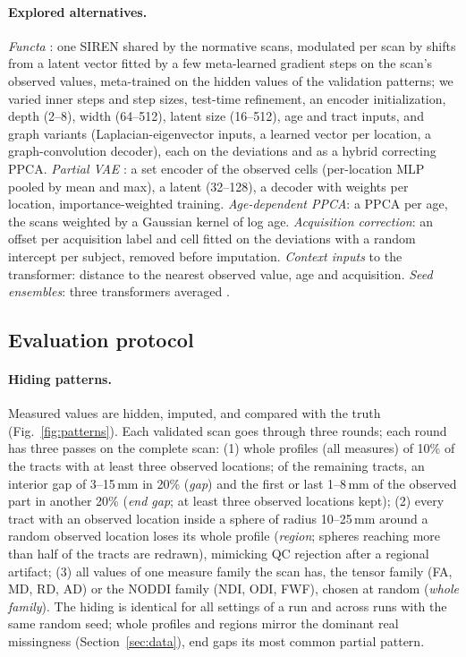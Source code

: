 \documentclass[11pt]{article}
\begin{document}
\paragraph{Explored alternatives.} \emph{Functa} \citep{dupont2022functa,friedrich2025medfuncta}: one SIREN shared
by the normative scans, modulated per scan by shifts from a latent vector fitted by a few meta-learned gradient steps
on the scan's observed values, meta-trained on the hidden values of the validation patterns; we varied inner steps and
step sizes, test-time refinement, an encoder initialization, depth (2--8), width (64--512), latent size (16--512), age
and tract inputs, and graph variants (Laplacian-eigenvector inputs, a learned vector per location, a graph-convolution
decoder), each on the deviations and as a hybrid correcting PPCA. \emph{Partial VAE}
\citep{ma2019eddi,mattei2019miwae}: a set encoder of the observed cells (per-location MLP pooled by mean and max), a
latent (32--128), a decoder with weights per location, importance-weighted training. \emph{Age-dependent PPCA}: a PPCA
per age, the scans weighted by a Gaussian kernel of log age. \emph{Acquisition correction}: an offset per acquisition
label and cell fitted on the deviations with a random intercept per subject, removed before imputation. \emph{Context
inputs} to the transformer: distance to the nearest observed value, age and acquisition. \emph{Seed ensembles}: three
transformers averaged \citep{lakshminarayanan2017ensembles}.

\subsection{Evaluation protocol}\label{sec:protocol}

\paragraph{Hiding patterns.} Measured values are hidden, imputed, and compared with the truth (Fig.~\ref{fig:patterns}).
Each validated scan goes through three rounds; each round has three passes on the complete scan:
(1) whole profiles (all measures) of 10\% of the tracts with at least three observed locations; of the remaining tracts,
an interior gap of 3--15\,mm in 20\% (\emph{gap}) and the first or last 1--8\,mm of the observed part in another 20\%
(\emph{end gap}; at least three observed locations kept); (2) every tract with an observed location inside a sphere of
radius 10--25\,mm around a random observed location loses its whole profile (\emph{region}; spheres reaching more than
half of the tracts are redrawn), mimicking QC rejection after a regional artifact; (3) all values of one measure family
the scan has, the tensor family (FA, MD, RD, AD) or the NODDI family (NDI, ODI, FWF), chosen at random (\emph{whole
family}). The hiding is identical for all settings of a run and across runs with the same random seed; whole profiles
and regions mirror the dominant real missingness (Section~\ref{sec:data}), end gaps its most common partial pattern.
\end{document}
